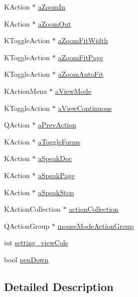 \begin{DoxyCompactItemize}
K\+Action $\ast$ \hyperlink{classPageViewPrivate_a07171f9e585da785aba41e84bf6014fb}{a\+Zoom\+In}
\item 
K\+Action $\ast$ \hyperlink{classPageViewPrivate_a193ef99e27c1d7c1b1741e33ada152ec}{a\+Zoom\+Out}
\item 
K\+Toggle\+Action $\ast$ \hyperlink{classPageViewPrivate_a251dae24330598db9ee9b7eb6015be3b}{a\+Zoom\+Fit\+Width}
\item 
K\+Toggle\+Action $\ast$ \hyperlink{classPageViewPrivate_a821a7981295e5366b2f3d489b501ae37}{a\+Zoom\+Fit\+Page}
\item 
K\+Toggle\+Action $\ast$ \hyperlink{classPageViewPrivate_ad119458f9f75be63ae18c65e86ded044}{a\+Zoom\+Auto\+Fit}
\item 
K\+Action\+Menu $\ast$ \hyperlink{classPageViewPrivate_a89d998dea21b24010b2578c6b4f5d9d2}{a\+View\+Mode}
\item 
K\+Toggle\+Action $\ast$ \hyperlink{classPageViewPrivate_a9b68e639f07533308f37c0e1654a9c9a}{a\+View\+Continuous}
\item 
Q\+Action $\ast$ \hyperlink{classPageViewPrivate_a63b5ccd8ed0f4ac9a89c040aeb3173a9}{a\+Prev\+Action}
\item 
K\+Action $\ast$ \hyperlink{classPageViewPrivate_af0990514eb2a448c1400a4cecc0ca6bb}{a\+Toggle\+Forms}
\item 
K\+Action $\ast$ \hyperlink{classPageViewPrivate_ae017762cbf8b93ab294f647563d6ccf0}{a\+Speak\+Doc}
\item 
K\+Action $\ast$ \hyperlink{classPageViewPrivate_abcf8673f8ee893b554984b46cc1b30d8}{a\+Speak\+Page}
\item 
K\+Action $\ast$ \hyperlink{classPageViewPrivate_ac0ad1db7d08f13202e952d1b0743a377}{a\+Speak\+Stop}
\item 
K\+Action\+Collection $\ast$ \hyperlink{classPageViewPrivate_a6abf868c8b0713a89291d48eef79d193}{action\+Collection}
\item 
Q\+Action\+Group $\ast$ \hyperlink{classPageViewPrivate_ae7b75854286f78f9b871f99bebb1eb73}{mouse\+Mode\+Action\+Group}
\item 
int \hyperlink{classPageViewPrivate_a21714496870aaec57f163f23a696da48}{setting\+\_\+view\+Cols}
\item 
bool \hyperlink{classPageViewPrivate_ae7a7857d6dac44fa07cb314a6f239df1}{pen\+Down}
\end{DoxyCompactItemize}


\subsection{Detailed Description}


